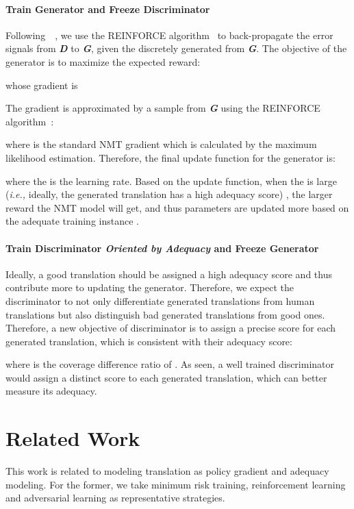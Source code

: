 \documentclass[letterpaper]{article} \usepackage{aaai19}  \usepackage{times}  \usepackage{helvet}  \usepackage{courier}  \usepackage{url}  \usepackage{graphicx}  \frenchspacing  \setlength{\pdfpagewidth}{8.5in}  \setlength{\pdfpageheight}{11in}  \usepackage{amsmath}
\begin{document}
\paragraph{Train Generator and Freeze Discriminator}
Following~\citeauthor{wu2017adversarial}~, we use the REINFORCE algorithm~\cite{williams1992simple} to back-propagate the error signals from {\bf \em D} to {\bf \em G}, given the discretely generated  from {\bf \em G}. The objective of the generator is to maximize the expected reward:

whose gradient is
 
The gradient is approximated by a sample from {\bf \em G} using the REINFORCE algorithm~\cite{williams1992simple}:

where  is the standard NMT gradient which is calculated by the maximum likelihood estimation.
Therefore, the final update function for the generator is:

where the  is the learning rate.
Based on the update function, when the  is large (\emph{i.e.,}\xspace ideally, the generated translation  has a high adequacy score) , the larger reward the NMT model will get, and thus parameters are updated more based on the adequate training instance .




\paragraph{Train Discriminator {\em Oriented by Adequacy} and Freeze Generator}
Ideally, a good translation  should be assigned a high adequacy score  and thus contribute more to updating the generator.
Therefore, we expect the discriminator to not only differentiate generated translations from human translations but also distinguish bad generated translations from good ones. 
Therefore, a new objective of discriminator is to assign a precise score for each generated translation, which is consistent with their adequacy score:

where  is the coverage difference ratio of . As seen, a well trained discriminator would assign a distinct score to each generated translation, which can better measure its adequacy.
\section{Related Work}



This work is related to modeling translation as policy gradient and adequacy modeling. For the former, we take minimum risk training, reinforcement learning and adversarial learning as representative strategies. 
\end{document}
